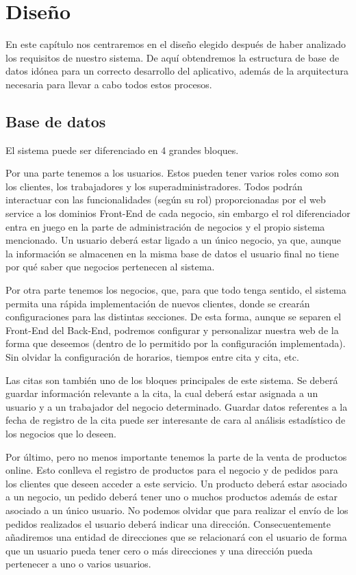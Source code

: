 \chapter{Diseño}
 En este capítulo nos centraremos en el diseño elegido después de haber analizado los requisitos de nuestro sistema. De aquí obtendremos la estructura de base de datos idónea para un correcto desarrollo del aplicativo, además de la arquitectura necesaria para llevar a cabo todos estos procesos.
 
\section{Base de datos}

El sistema puede ser diferenciado en 4 grandes bloques.

Por una parte tenemos a los usuarios. Estos pueden tener varios roles como son los clientes, los trabajadores y los superadministradores. Todos podrán interactuar con las funcionalidades (según su rol)  proporcionadas por el web service a los dominios Front-End de cada negocio, sin embargo el rol diferenciador entra en juego en la parte de administración de negocios y el propio sistema mencionado. Un usuario deberá estar ligado a un único negocio, ya que, aunque la información se almacenen en la misma base de datos el usuario final no tiene por qué saber que negocios pertenecen al sistema.

Por otra parte tenemos los negocios, que, para que todo tenga sentido, el sistema permita una rápida implementación de nuevos clientes, donde se crearán configuraciones para las distintas secciones. De esta forma, aunque se separen el Front-End del Back-End, podremos configurar y personalizar nuestra web de la forma que deseemos (dentro de lo permitido por la configuración implementada). Sin olvidar la configuración de horarios, tiempos entre cita y cita, etc.

Las citas son también uno de los bloques principales de este sistema. Se deberá guardar información relevante a la cita, la cual deberá estar asignada a un usuario y a un trabajador del negocio determinado. Guardar datos referentes a la fecha de registro de la cita puede ser interesante de cara al análisis estadístico de los negocios que lo deseen.

Por último, pero no menos importante tenemos la parte de la venta de productos online. Esto conlleva el registro de productos para el negocio y de pedidos para los clientes que deseen acceder a este servicio. Un producto deberá estar asociado a un negocio, un pedido deberá tener uno o muchos productos además de estar asociado a un único usuario. No podemos olvidar que para realizar el envío de los pedidos realizados el usuario deberá indicar una dirección. Consecuentemente añadiremos una entidad de direcciones que se relacionará con el usuario de forma que un usuario pueda tener cero o más direcciones y una dirección pueda pertenecer a uno o varios usuarios.

